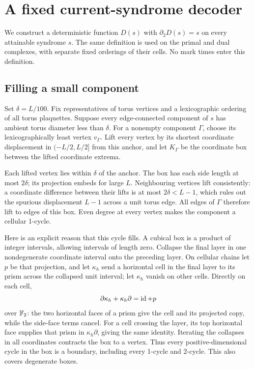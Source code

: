 \section{A fixed current-syndrome decoder}\label{sec:decoder}

We construct a deterministic function \(D(s)\) with
\(\partial_2D(s)=s\) on every attainable syndrome \(s\). The same
definition is used on the primal and dual complexes, with separate
fixed orderings of their cells. No mark times enter this definition.

\subsection{Filling a small component}

Set \(\delta=L/100\). Fix representatives of torus vertices and a
lexicographic ordering of all torus plaquettes. Suppose every
edge-connected component of \(s\) has ambient torus diameter less
than \(\delta\). For a nonempty component \(\Gamma\), choose its
lexicographically least vertex \(v_\Gamma\). Lift every vertex by
its shortest coordinate displacement in \((-L/2,L/2]\) from this
anchor, and let \(K_\Gamma\) be the coordinate box between the lifted
coordinate extrema.

Each lifted vertex lies within \(\delta\) of the anchor. The box has
each side length at most \(2\delta\); its projection embeds for large
\(L\). Neighbouring vertices lift consistently: a coordinate
difference between their lifts is at most \(2\delta<L-1\), which
rules out the spurious displacement \(L-1\) across a unit torus edge.
All edges of \(\Gamma\) therefore lift to edges of this box.
Even degree at every vertex makes the component a cellular 1-cycle.

Here is an explicit reason that this cycle fills. A cubical box is
a product of integer intervals, allowing intervals of length zero.
Collapse the final layer in one nondegenerate coordinate interval
onto the preceding layer. On cellular chains let \(p\) be that
projection, and let \(\kappa_h\) send a horizontal cell in the final layer
to its prism across the collapsed unit interval; let \(\kappa_h\) vanish
on other cells. Directly on each cell,
\[
 \partial\kappa_h+\kappa_h\partial=\operatorname{id}+p
\]
over \(\mathbb F_2\): the two horizontal faces of a prism give the cell and
its projected copy, while the side-face terms cancel. For a cell
crossing the layer, its top horizontal face supplies that prism
in \(\kappa_h\partial\), giving the same identity. Iterating the collapses
in all coordinates contracts the box to a vertex. Thus every
positive-dimensional cycle in the box is a boundary, including
every 1-cycle and 2-cycle. This also covers degenerate boxes.

